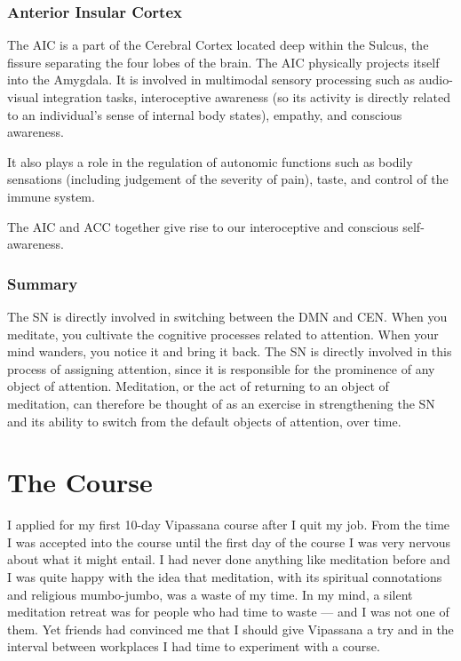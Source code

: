 \documentclass[a4paper, amsfonts, amssymb, amsmath, reprint, showkeys, nofootinbib, twoside]{revtex4-1}
\begin{document}
\subsubsection{Anterior Insular Cortex}

The AIC is a part of the Cerebral Cortex located deep within the Sulcus, the
fissure separating the four lobes of the brain. The AIC physically projects itself
into the Amygdala. It is involved in multimodal sensory processing such as
audio-visual integration tasks, interoceptive awareness (so its activity is directly
related to an individual's sense of internal body states), empathy, and conscious
awareness. \cite{aicemotion}

It also plays a role in the regulation of autonomic functions such as bodily
sensations (including judgement of the severity of pain), taste, and control of the
immune system. \cite{aicautonomic}

The AIC and ACC together give rise to our interoceptive and conscious
self-awareness.  \cite{selfaware}

\subsubsection{Summary}

The SN is directly involved in switching between the DMN and CEN. When you meditate,
you cultivate the cognitive processes related to attention.
When your mind wanders, you notice it and bring it back.
The SN is directly involved in this process of assigning attention, since it is
responsible for the prominence of any object of attention.
Meditation, or the act of returning to an object of meditation, can therefore be
thought of as an exercise in strengthening the SN and its ability to switch from
the default objects of attention, over time.


\section{The Course}

I applied for my first 10-day Vipassana course after I quit my job. From the time I
was accepted into the course until the first day of the course I was very nervous
about what it might entail. I had never done anything like meditation before
and I was quite happy with the idea that meditation, with its spiritual connotations
and religious mumbo-jumbo, was a waste of my time. In my mind, a silent meditation retreat was
for people who had time to waste --- and I was not one of them. Yet friends had convinced me that I
should give Vipassana a try and in the interval between workplaces I had
time to experiment with a course.
\end{document}
